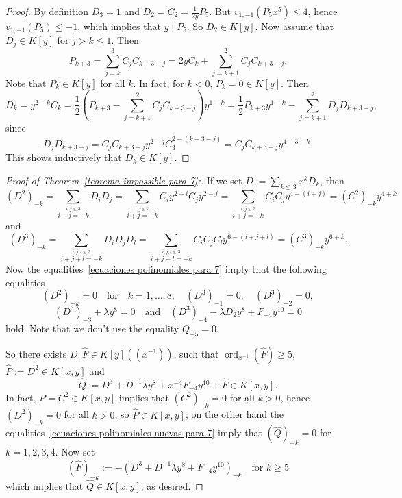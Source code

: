 \documentclass[reqno,a4paper,twoside]{amsart}
\theoremstyle{definition}
\theoremstyle{remark}
\DeclareMathOperator{\ord}{ord}
\begin{document}
\begin{proof}
  By definition $D_3=1$ and $D_2=C_2 =\frac 1{2y} P_5$. But $v_{1,-1}(P_5 x^5)\le 4$, hence $v_{1,-1}(P_5)\le -1$, which implies that
  $y\mid P_5$. So $D_2\in K[y]$.
  Now assume that $D_j\in K[y]$ for $j>k\le 1$. Then
  $$
  P_{k+3}=\sum_{j=k}^{3} C_j C_{k+3-j}=2y C_k+\sum_{j=k+1}^{2} C_j C_{k+3-j}.
  $$
  Note that $P_k\in K[y]$ for all $k$. In fact, for $k<0$, $P_k=0\in K[y]$.
  Then
  $$
  D_k=y^{2-k}C_k=\frac 12\left(P_{k+3}-\sum_{j=k+1}^{2} C_j C_{k+3-j} \right)y^{1-k}=\frac 12 P_{k+3}y^{1-k}-\sum_{j=k+1}^{2} D_j D_{k+3-j},
  $$
  since
  $$
  D_j D_{k+3-j}=C_j C_{k+3-j}y^{2-j}C_3^{2-(k+3-j)}=C_j C_{k+3-j}y^{4-3-k}.
  $$
  This shows inductively that $D_k\in K[y]$.
\end{proof}
\begin{proof}[Proof of Theorem~\ref{teorema impossible para 7}:]
If we set $D:=\sum_{k\le 3} x^k D_k$, then
$$
(D^2)_{-k}=\sum_{\overset{i,j\le 3}{i+j=-k}}D_i D_j=\sum_{\overset{i,j\le 3}{i+j=-k}}C_i y^{2-i}C_j y^{2-j}=\sum_{\overset{i,j\le 3}{i+j=-k}}C_i C_j y^{4-(i+j)}=(C^2)_{-k}y^{4+k}
$$
and
$$
(D^3)_{-k}=\sum_{\overset{i,j,l\le 3}{i+j+l=-k}}D_i D_jD_l=\sum_{\overset{i,j,l\le 3}{i+j+l=-k}}C_i C_jC_l y^{6-(i+j+l)}=(C^3)_{-k} y^{6+k}.
$$
Now the equalities~\eqref{ecuaciones polinomiales para 7} imply that the following equalities
\begin{equation}\label{ecuaciones polinomiales nuevas para 7}
(D^2)_{-k}=0\quad\text{for}\quad k=1,\dots,8,\quad (D^3)_{-1}=0,\quad (D^3)_{-2}=0,
\end{equation}
$$
(D^3)_{-3}+\lambda y^8=0\quad\text{and}\quad  (D^3)_{-4}-\lambda D_2 y^8+F_{-4}y^{10}=0
$$
hold. Note that we don't use the equality $Q_{-5}=0$.

So there exists $D,\hat F\in K[y]((x^{-1}))$, such that $\ord_{x^{-1}}(\hat F)\ge 5$, $\hat P:= D^2\in K[x,y]$ and
$$
\hat Q:=D^3+D^{-1}\lambda y^8 +x^{-4}F_{-4}y^{10}+\hat F\in K[x,y].
$$
In fact, $P=C^2\in K[x,y]$ implies that $(C^2)_{-k}=0$ for all $k>0$, hence $(D^2)_{-k}=0$ for all $k>0$, so $\hat P\in K[x,y]$;
on the other hand the equalities~\eqref{ecuaciones polinomiales nuevas para 7} imply that
$(\hat Q)_{-k}=0$ for $k=1,2,3,4$. Now set
$$
(\hat F)_{-k}:=-(D^3+D^{-1}\lambda y^8+F_{-4} y^{10})_{-k}\quad\text{for $k\ge 5$}
$$
which implies that $\hat Q\in K[x,y]$, as desired.


\end{proof}
\end{document}
